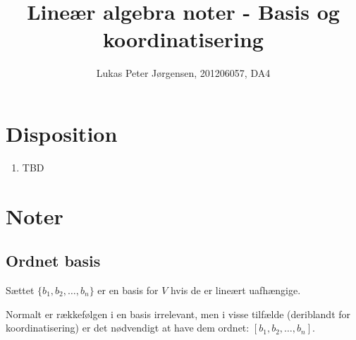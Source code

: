 \documentclass[a4paper,oneside,article]{memoir}
\begin{document}
    \title{Lineær algebra noter - Basis og koordinatisering}
    \author{Lukas Peter Jørgensen, 201206057, DA4
            }
    \maketitle
        	
    \tableofcontents
        
    \chapter{Disposition}
    \begin{enumerate}
    	\item TBD
    \end{enumerate}
    
	\chapter{Noter}
	
	\section{Ordnet basis}
	Sættet $\{b_1,b_2,\dots,b_n\}$ er en basis for $V$ hvis 
	de er lineært uafhængige.
	
	Normalt er rækkefølgen i en basis irrelevant, men i visse
	tilfælde (deriblandt for koordinatisering) er det nødvendigt
	at have dem ordnet: $[b_1,b_2,\dots,b_n]$.
	
\end{document}
